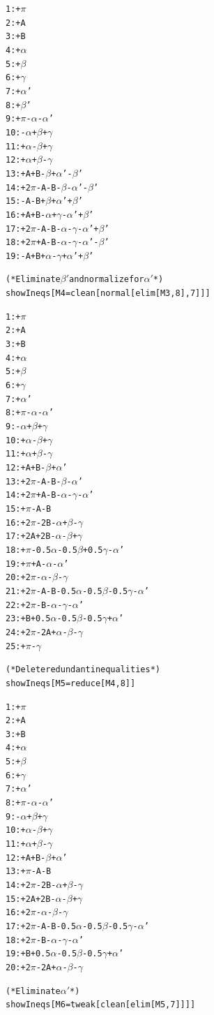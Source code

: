 \documentclass[a4paper, twoside]{article}
\begin{document}
{\begin{alltt}
1: +\(\pi\)
2: +A
3: +B
4: +\(\alpha\)
5: +\(\beta\)
6: +\(\gamma\)
7: +\(\alpha\)'
8: +\(\beta\)'
9: +\(\pi\)-\(\alpha\)-\(\alpha\)'
10: -\(\alpha\)+\(\beta\)+\(\gamma\)
11: +\(\alpha\)-\(\beta\)+\(\gamma\)
12: +\(\alpha\)+\(\beta\)-\(\gamma\)
13: +A+B-\(\beta\)+\(\alpha\)'-\(\beta\)'
14: +2\(\pi\)-A-B-\(\beta\)-\(\alpha\)'-\(\beta\)'
15: -A-B+\(\beta\)+\(\alpha\)'+\(\beta\)'
16: +A+B-\(\alpha\)+\(\gamma\)-\(\alpha\)'+\(\beta\)'
17: +2\(\pi\)-A-B-\(\alpha\)-\(\gamma\)-\(\alpha\)'+\(\beta\)'
18: +2\(\pi\)+A-B-\(\alpha\)-\(\gamma\)-\(\alpha\)'-\(\beta\)'
19: -A+B+\(\alpha\)-\(\gamma\)+\(\alpha\)'+\(\beta\)'

(* Eliminate \(\beta'\) and normalize for \(\alpha'\) *)
showIneqs[ M4 = clean[normal[elim[M3, 8], 7]] ] 

1: +\(\pi\)
2: +A
3: +B
4: +\(\alpha\)
5: +\(\beta\)
6: +\(\gamma\)
7: +\(\alpha\)'
8: +\(\pi\)-\(\alpha\)-\(\alpha\)'
9: -\(\alpha\)+\(\beta\)+\(\gamma\)
10: +\(\alpha\)-\(\beta\)+\(\gamma\)
11: +\(\alpha\)+\(\beta\)-\(\gamma\)
12: +A+B-\(\beta\)+\(\alpha\)'
13: +2\(\pi\)-A-B-\(\beta\)-\(\alpha\)'
14: +2\(\pi\)+A-B-\(\alpha\)-\(\gamma\)-\(\alpha\)'
15: +\(\pi\)-A-B
16: +2\(\pi\)-2B-\(\alpha\)+\(\beta\)-\(\gamma\)
17: +2A+2B-\(\alpha\)-\(\beta\)+\(\gamma\)
18: +\(\pi\)-0.5\(\alpha\)-0.5\(\beta\)+0.5\(\gamma\)-\(\alpha\)'
19: +\(\pi\)+A-\(\alpha\)-\(\alpha\)'
20: +2\(\pi\)-\(\alpha\)-\(\beta\)-\(\gamma\)
21: +2\(\pi\)-A-B-0.5\(\alpha\)-0.5\(\beta\)-0.5\(\gamma\)-\(\alpha\)'
22: +2\(\pi\)-B-\(\alpha\)-\(\gamma\)-\(\alpha\)'
23: +B+0.5\(\alpha\)-0.5\(\beta\)-0.5\(\gamma\)+\(\alpha\)'
24: +2\(\pi\)-2A+\(\alpha\)-\(\beta\)-\(\gamma\)
25: +\(\pi\)-\(\gamma\)

(* Delete redundant inequalities *) 
showIneqs[ M5 = reduce[M4, 8] ]

1: +\(\pi\)
2: +A
3: +B
4: +\(\alpha\)
5: +\(\beta\)
6: +\(\gamma\)
7: +\(\alpha\)'
8: +\(\pi\)-\(\alpha\)-\(\alpha\)'
9: -\(\alpha\)+\(\beta\)+\(\gamma\)
10: +\(\alpha\)-\(\beta\)+\(\gamma\)
11: +\(\alpha\)+\(\beta\)-\(\gamma\)
12: +A+B-\(\beta\)+\(\alpha\)'
13: +\(\pi\)-A-B
14: +2\(\pi\)-2B-\(\alpha\)+\(\beta\)-\(\gamma\)
15: +2A+2B-\(\alpha\)-\(\beta\)+\(\gamma\)
16: +2\(\pi\)-\(\alpha\)-\(\beta\)-\(\gamma\)
17: +2\(\pi\)-A-B-0.5\(\alpha\)-0.5\(\beta\)-0.5\(\gamma\)-\(\alpha\)'
18: +2\(\pi\)-B-\(\alpha\)-\(\gamma\)-\(\alpha\)'
19: +B+0.5\(\alpha\)-0.5\(\beta\)-0.5\(\gamma\)+\(\alpha\)'
20: +2\(\pi\)-2A+\(\alpha\)-\(\beta\)-\(\gamma\)

(* Eliminate \(\alpha'\) *)
showIneqs[ M6 = tweak[clean[elim[M5, 7]]] ] 


\end{alltt}}
\end{document}
